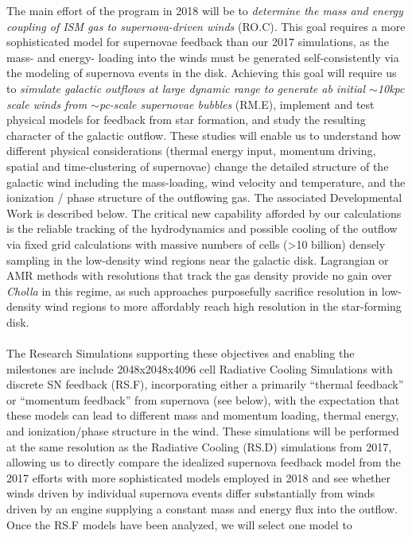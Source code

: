 \documentclass[11pt,letterpaper,english]{article}
\begin{document}
The main effort of the program in 2018 will be to \textit{determine the mass and energy coupling of ISM gas
to supernova-driven winds} (RO.C). This goal requires a more sophisticated model for supernovae feedback than our
2017 simulations, as the mass- and energy- loading into the winds must be generated self-consistently via the
modeling of supernova events in the disk. Achieving this goal will require us to
\textit{simulate galactic outflows at large dynamic
range to generate ab initial $\sim$10kpc scale winds from $\sim$pc-scale supernovae bubbles} (RM.E), 
implement and test physical models for feedback from star formation, and study the resulting character of the galactic outflow. These studies will enable us to understand how different physical considerations (thermal energy input, momentum driving, spatial and time-clustering of supernovae) change the detailed structure of the galactic wind including the mass-loading, wind velocity and temperature, and the ionization / phase structure of the outflowing gas. The associated Developmental Work is described below.
The critical new capability afforded by our calculations is the reliable tracking of the hydrodynamics and possible cooling of the outflow via fixed grid calculations with massive numbers of cells (>10 billion) densely sampling in the low-density wind regions near the galactic disk. Lagrangian or AMR methods with resolutions that track the gas density provide no gain over 
\textit{Cholla} in this regime, as such approaches purposefully sacrifice resolution in low-density wind regions to more affordably reach high resolution in the star-forming disk. 
~\\~\\
The Research Simulations supporting these objectives and enabling the milestones are include 
2048x2048x4096 cell Radiative Cooling Simulations
with discrete SN feedback (RS.F), incorporating
either a primarily ``thermal feedback'' or ``momentum feedback'' from supernova (see below), with the expectation that these
models can lead to different mass and momentum loading, thermal energy, and ionization/phase structure in the wind.  These
simulations will be performed at the same resolution as the Radiative Cooling (RS.D) simulations from 2017, allowing us to
directly compare the idealized supernova feedback model from the 2017 efforts with more sophisticated models employed in
2018 and see whether winds driven by individual supernova events differ substantially from winds driven by an engine
supplying a constant mass and energy flux into the outflow.  Once the RS.F models have been analyzed, we will select
one model to 
\end{document}
